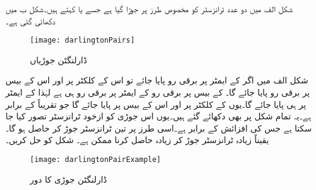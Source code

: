 شکل  الف میں دو عدد  ٹرانزسٹر کو مخصوص طرز پر جوڑا گیا ہے جسے   یا  کہتے ہیں۔شکل  ب میں   دکھائی گئی ہے۔
\begin{figure}
\centering
\texttt{[image: darlingtonPairs]}
\caption{ڈارلنگٹن جوڑیاں}
\label{شکل_ٹرانزسٹر_ڈارلنگٹن_جوڑیاں}
\end{figure}

شکل  الف   میں اگر  کے ایمٹر پر  برقی رو پایا جائے تو اس کے کلکٹر  پر  اور اس کے بیس پر  برقی رو پایا جائے گا۔ کے بیس پر برقی رو  کے ایمٹر پر برقی رو ہی ہے لہٰذا  کے ایمٹر پر  ہی پایا جائے گا۔یوں  کے کلکٹر  پر  اور اس کے بیس پر  پایا جائے گا جو تقریباً  کے برابر ہے۔یہ تمام شکل پر بھی دکھائے گئے ہیں۔یوں اس جوڑی کو ازخود ٹرانزسٹر تصور کیا جا سکتا ہے جس کی افزائش  کے برابر ہے۔اسی طرز پر تین ٹرانزسٹر جوڑ کر  حاصل ہو گا۔یقیناً زیادہ ٹرانزسٹر جوڑ کر زیادہ  حاصل کرنا ممکن ہے۔
شکل  کو حل کریں۔
\begin{figure}
\centering
\texttt{[image: darlingtonPairExample]}
\caption{ڈارلنگٹن جوڑی کا دور}
\label{شکل_ٹرانزسٹر_ڈارلنگٹن_جوڑی_مثال}
\end{figure}


